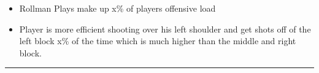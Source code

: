\documentclass[a4paper,12pt]{article}
\begin{document}
\begin{itemize}
    \item Rollman Plays make up x\% of players offensive load
    \vspace{0.3em} %
    \item Player is more efficient shooting over his left shoulder and get shots off of the left block x\% of the time which is much higher than the middle and right block.
\end{itemize}

\vspace{1em} %
\hrule height 1pt width 1\textwidth %
\vspace{0em} %
\end{document}
